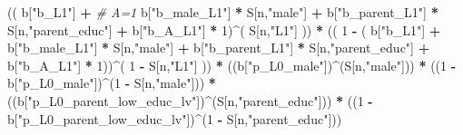 \documentclass[
]{book}
\newenvironment{Shaded}{\begin{snugshade}}{\end{snugshade}}
\newcommand{\CommentTok}[1]{\textcolor[rgb]{0.56,0.35,0.01}{\textit{#1}}}
\newcommand{\DecValTok}[1]{\textcolor[rgb]{0.00,0.00,0.81}{#1}}
\newcommand{\NormalTok}[1]{#1}
\newcommand{\SpecialCharTok}[1]{\textcolor[rgb]{0.81,0.36,0.00}{\textbf{#1}}}
\newcommand{\StringTok}[1]{\textcolor[rgb]{0.31,0.60,0.02}{#1}}
\begin{document}
\begin{Shaded}
\begin{Highlighting}[]
\NormalTok{      (( b[}\StringTok{"b\_L1"}\NormalTok{] }\SpecialCharTok{+}                                                            \CommentTok{\# A=1}
\NormalTok{           b[}\StringTok{"b\_male\_L1"}\NormalTok{] }\SpecialCharTok{*}\NormalTok{ S[n,}\StringTok{"male"}\NormalTok{] }\SpecialCharTok{+}  
\NormalTok{           b[}\StringTok{"b\_parent\_L1"}\NormalTok{] }\SpecialCharTok{*}\NormalTok{ S[n,}\StringTok{"parent\_educ"}\NormalTok{] }\SpecialCharTok{+}
\NormalTok{           b[}\StringTok{"b\_A\_L1"}\NormalTok{] }\SpecialCharTok{*} \DecValTok{1}\NormalTok{)}\SpecialCharTok{\^{}}\NormalTok{( S[n,}\StringTok{"L1"}\NormalTok{] )) }\SpecialCharTok{*}
\NormalTok{      (( }\DecValTok{1} \SpecialCharTok{{-}}\NormalTok{ ( b[}\StringTok{"b\_L1"}\NormalTok{] }\SpecialCharTok{+}
\NormalTok{                 b[}\StringTok{"b\_male\_L1"}\NormalTok{] }\SpecialCharTok{*}\NormalTok{ S[n,}\StringTok{"male"}\NormalTok{] }\SpecialCharTok{+}  
\NormalTok{                 b[}\StringTok{"b\_parent\_L1"}\NormalTok{] }\SpecialCharTok{*}\NormalTok{ S[n,}\StringTok{"parent\_educ"}\NormalTok{] }\SpecialCharTok{+}
\NormalTok{                 b[}\StringTok{"b\_A\_L1"}\NormalTok{] }\SpecialCharTok{*} \DecValTok{1}\NormalTok{))}\SpecialCharTok{\^{}}\NormalTok{( }\DecValTok{1} \SpecialCharTok{{-}}\NormalTok{ S[n,}\StringTok{"L1"}\NormalTok{] )) }\SpecialCharTok{*}
\NormalTok{      ((b[}\StringTok{"p\_L0\_male"}\NormalTok{])}\SpecialCharTok{\^{}}\NormalTok{(S[n,}\StringTok{"male"}\NormalTok{])) }\SpecialCharTok{*} 
\NormalTok{      ((}\DecValTok{1} \SpecialCharTok{{-}}\NormalTok{ b[}\StringTok{"p\_L0\_male"}\NormalTok{])}\SpecialCharTok{\^{}}\NormalTok{(}\DecValTok{1} \SpecialCharTok{{-}}\NormalTok{ S[n,}\StringTok{"male"}\NormalTok{])) }\SpecialCharTok{*} 
\NormalTok{      ((b[}\StringTok{"p\_L0\_parent\_low\_educ\_lv"}\NormalTok{])}\SpecialCharTok{\^{}}\NormalTok{(S[n,}\StringTok{"parent\_educ"}\NormalTok{])) }\SpecialCharTok{*}
\NormalTok{      ((}\DecValTok{1} \SpecialCharTok{{-}}\NormalTok{ b[}\StringTok{"p\_L0\_parent\_low\_educ\_lv"}\NormalTok{])}\SpecialCharTok{\^{}}\NormalTok{(}\DecValTok{1} \SpecialCharTok{{-}}\NormalTok{ S[n,}\StringTok{"parent\_educ"}\NormalTok{])) }
    

\end{Highlighting}
\end{Shaded}
\end{document}
